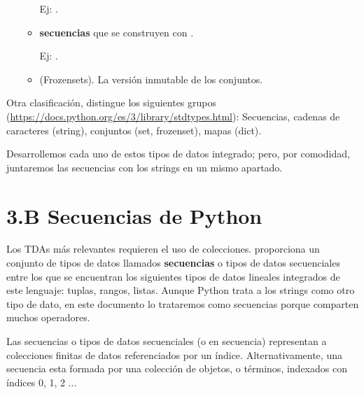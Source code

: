 \begin{itemize}
\begin{itemize}
Ej: .

\item {} \textbf{secuencias} que se construyen con  . 

Ej: .

\item {} (Frozensets). La versión inmutable de los conjuntos.

\end{itemize}


\end{itemize}


Otra clasificación, distingue los siguientes grupos (\url{https://docs.python.org/es/3/library/stdtypes.html}):
Secuencias, cadenas de caracteres (string), conjuntos (set, frozenset), mapas (dict).

Desarrollemos cada uno de estos tipos de datos integrado; pero, por comodidad, juntaremos las secuencias con los strings en un mismo apartado.




\section*{3.B Secuencias de Python}

Los TDAs más relevantes requieren el uso de colecciones.
 proporciona un conjunto de tipos de datos llamados \textbf{secuencias}  o tipos de datos secuenciales entre los que se encuentran los siguientes tipos de datos lineales integrados de este lenguaje: tuplas, rangos, listas. Aunque Python trata a los strings como otro tipo de dato, en este documento lo trataremos como secuencias porque comparten muchos operadores.

Las secuencias o tipos de datos secuenciales (o en secuencia) representan a colecciones finitas de datos referenciados por un índice. Alternativamente, una secuencia esta formada por una colección de objetos, o términos, indexados con índices 0, 1, 2 ...

